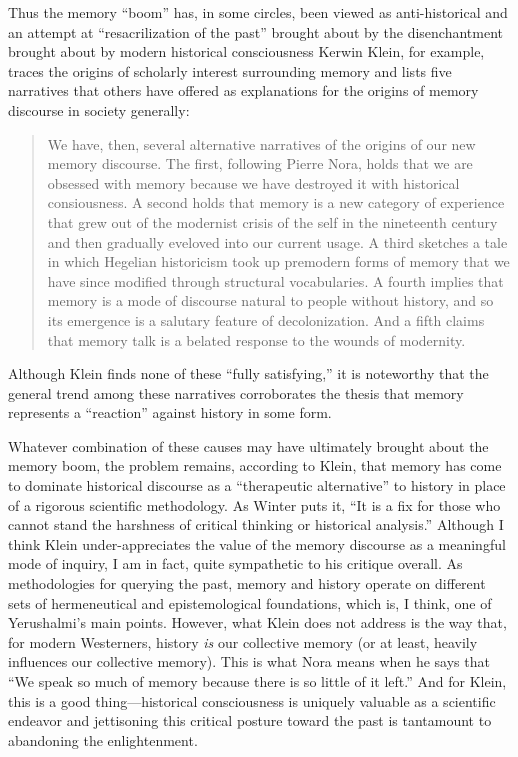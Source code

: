 Thus the memory ``boom'' has, in some circles, been viewed as
anti-historical and an attempt at ``resacrilization of the past''
brought about by the disenchantment brought about by modern historical
consciousness\autocite[282]{winter2006} Kerwin Klein, for example,
traces the origins of scholarly interest surrounding memory and lists
five narratives that others have offered as explanations for the origins
of memory discourse in society generally:

\begin{quote}
We have, then, several alternative narratives of the origins of our new
memory discourse. The first, following Pierre Nora, holds that we are
obsessed with memory because we have destroyed it with historical
consiousness. A second holds that memory is a new category of experience
that grew out of the modernist crisis of the self in the nineteenth
century and then gradually eveloved into our current usage. A third
sketches a tale in which Hegelian historicism took up premodern forms of
memory that we have since modified through structural vocabularies. A
fourth implies that memory is a mode of discourse natural to people
without history, and so its emergence is a salutary feature of
decolonization. And a fifth claims that memory talk is a belated
response to the wounds of modernity.\autocite[134]{klein_klein2011}
\end{quote}

Although Klein finds none of these ``fully satisfying,'' it is
noteworthy that the general trend among these narratives corroborates
the thesis that memory represents a ``reaction'' against history in some
form.

Whatever combination of these causes may have ultimately brought about
the memory boom, the problem remains, according to Klein, that memory
has come to dominate historical discourse as a ``therapeutic
alternative'' to history in place of a rigorous scientific
methodology.\autocite[137]{klein2011} As Winter puts it, ``It is a fix
for those who cannot stand the harshness of critical thinking or
historical analysis.''\autocite[283 (summarizing Klein)]{winter2006}
Although I think Klein under-appreciates the value of the memory
discourse as a meaningful mode of inquiry, I am in fact, quite
sympathetic to his critique overall. As methodologies for querying the
past, memory and history operate on different sets of hermeneutical and
epistemological foundations, which is, I think, one of Yerushalmi's main
points. However, what Klein does not address is the way that, for modern
Westerners, history \emph{is} our collective memory (or at least,
heavily influences our collective memory). This is what Nora means when
he says that ``We speak so much of memory because there is so little of
it left.''\autocite[7]{nora_representations1989} And for Klein, this is
a good thing---historical consciousness is uniquely valuable as a
scientific endeavor and jettisoning this critical posture toward the
past is tantamount to abandoning the enlightenment.


